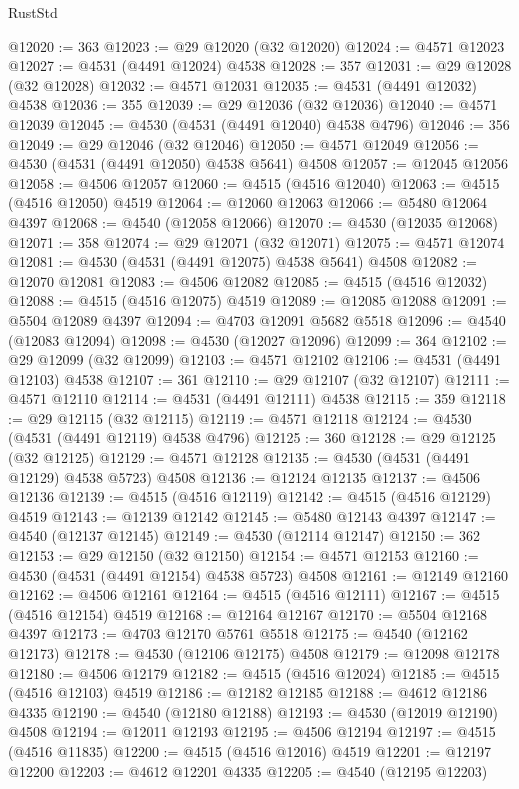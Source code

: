 \begin{lexlean}{RustStd}
\begin{coremodule}
@12020 := 363
@12023 := @29 @12020 (@32 @12020)
@12024 := @4571 @12023
@12027 := @4531 (@4491 @12024) @4538
@12028 := 357
@12031 := @29 @12028 (@32 @12028)
@12032 := @4571 @12031
@12035 := @4531 (@4491 @12032) @4538
@12036 := 355
@12039 := @29 @12036 (@32 @12036)
@12040 := @4571 @12039
@12045 := @4530 (@4531 (@4491 @12040) @4538 @4796)
@12046 := 356
@12049 := @29 @12046 (@32 @12046)
@12050 := @4571 @12049
@12056 := @4530 (@4531 (@4491 @12050) @4538 @5641) @4508
@12057 := @12045 @12056
@12058 := @4506 @12057
@12060 := @4515 (@4516 @12040)
@12063 := @4515 (@4516 @12050) @4519
@12064 := @12060 @12063
@12066 := @5480 @12064 @4397
@12068 := @4540 (@12058 @12066)
@12070 := @4530 (@12035 @12068)
@12071 := 358
@12074 := @29 @12071 (@32 @12071)
@12075 := @4571 @12074
@12081 := @4530 (@4531 (@4491 @12075) @4538 @5641) @4508
@12082 := @12070 @12081
@12083 := @4506 @12082
@12085 := @4515 (@4516 @12032)
@12088 := @4515 (@4516 @12075) @4519
@12089 := @12085 @12088
@12091 := @5504 @12089 @4397
@12094 := @4703 @12091 @5682 @5518
@12096 := @4540 (@12083 @12094)
@12098 := @4530 (@12027 @12096)
@12099 := 364
@12102 := @29 @12099 (@32 @12099)
@12103 := @4571 @12102
@12106 := @4531 (@4491 @12103) @4538
@12107 := 361
@12110 := @29 @12107 (@32 @12107)
@12111 := @4571 @12110
@12114 := @4531 (@4491 @12111) @4538
@12115 := 359
@12118 := @29 @12115 (@32 @12115)
@12119 := @4571 @12118
@12124 := @4530 (@4531 (@4491 @12119) @4538 @4796)
@12125 := 360
@12128 := @29 @12125 (@32 @12125)
@12129 := @4571 @12128
@12135 := @4530 (@4531 (@4491 @12129) @4538 @5723) @4508
@12136 := @12124 @12135
@12137 := @4506 @12136
@12139 := @4515 (@4516 @12119)
@12142 := @4515 (@4516 @12129) @4519
@12143 := @12139 @12142
@12145 := @5480 @12143 @4397
@12147 := @4540 (@12137 @12145)
@12149 := @4530 (@12114 @12147)
@12150 := 362
@12153 := @29 @12150 (@32 @12150)
@12154 := @4571 @12153
@12160 := @4530 (@4531 (@4491 @12154) @4538 @5723) @4508
@12161 := @12149 @12160
@12162 := @4506 @12161
@12164 := @4515 (@4516 @12111)
@12167 := @4515 (@4516 @12154) @4519
@12168 := @12164 @12167
@12170 := @5504 @12168 @4397
@12173 := @4703 @12170 @5761 @5518
@12175 := @4540 (@12162 @12173)
@12178 := @4530 (@12106 @12175) @4508
@12179 := @12098 @12178
@12180 := @4506 @12179
@12182 := @4515 (@4516 @12024)
@12185 := @4515 (@4516 @12103) @4519
@12186 := @12182 @12185
@12188 := @4612 @12186 @4335
@12190 := @4540 (@12180 @12188)
@12193 := @4530 (@12019 @12190) @4508
@12194 := @12011 @12193
@12195 := @4506 @12194
@12197 := @4515 (@4516 @11835)
@12200 := @4515 (@4516 @12016) @4519
@12201 := @12197 @12200
@12203 := @4612 @12201 @4335
@12205 := @4540 (@12195 @12203)

\end{coremodule}
\end{lexlean}
